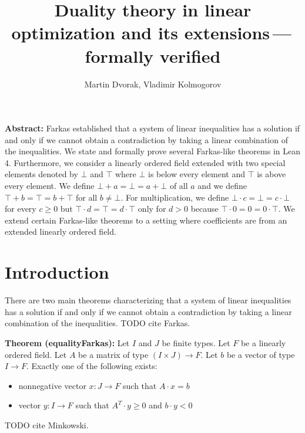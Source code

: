 \documentclass[]{article}
\renewcommand{\.}{\hskip .75pt}
\let\r=\rightarrow
\let\*=\cdot
\begin{document}


\title{Duality theory in linear optimization and its extensions\,---\,formally verified}
\author{Martin Dvorak, Vladimir Kolmogorov}
\date{}
\maketitle


\noindent \textbf{Abstract:}\;
Farkas established that a system of linear inequalities has a solution if and only if we cannot obtain
a contradiction by taking a linear combination of the inequalities.
We state and formally prove several Farkas-like theorems in Lean 4.
Furthermore, we consider a linearly ordered field extended with two special elements denoted by $\bot$ and $\top$
where $\bot$ is below every element and $\top$ is above every element.
We define $\bot + a = \bot = a + \bot$ of all $a$ and we define $\top + b = \top = b + \top$ for all $b \neq \bot$.
For multiplication, we define $\bot \cdot c = \bot = c \cdot \bot$ for every $c \ge 0$ but
$\top \cdot d = \top = d \cdot \top$ only for $d > 0$ because $\top \cdot 0 = 0 = 0 \cdot \top$.
We extend certain Farkas-like theorems to a setting where coefficients are from an extended linearly ordered field.


\section{Introduction}

There are two main theorems characterizing that a system of linear inequalities
has a solution if and only if we cannot obtain a contradiction
by taking a linear combination of the inequalities.
TODO cite Farkas.

\medskip \noindent
\textbf{Theorem (equalityFarkas):}
Let $I$ and $J$ be finite types.
Let $F$ be a linearly ordered field.
Let $A$ be a matrix of type $(I \times J) \r F$.
Let $b$ be a vector of type $I \r F$.
Exactly one of the following exists:
\begin{itemize}
\item nonnegative vector $x : J \r F$ such that $A \* x = b$
\item vector $y : I \r F$ such that $A^T\! \* y \ge 0$ and $b \* y < 0$
\end{itemize}
TODO cite Minkowski.
\end{document}
